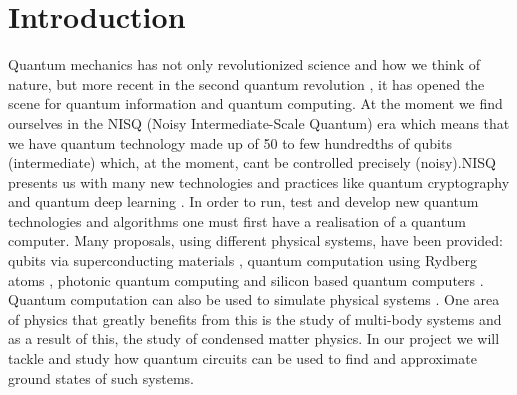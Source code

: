 \documentclass{physics_article}
\date{}
\begin{document}
	\maketitle

	\section{Introduction \label{intro}}
	Quantum mechanics has not only revolutionized science and how we think of nature, but more recent in the second quantum revolution \cite{https://doi.org/10.48550/arxiv.quant-ph/0206091}, it has opened the scene for quantum information and quantum computing. At the moment we find ourselves in the NISQ (Noisy Intermediate-Scale Quantum) era \cite{Preskill2018quantumcomputingin} which means that we have quantum technology made up of 50 to few hundredths of qubits (intermediate) which, at the moment, cant be controlled precisely (noisy).NISQ presents us with many new technologies and practices like quantum cryptography \cite{bernstein_buchmann_dahmen_2009} and quantum deep learning \cite{https://doi.org/10.48550/arxiv.1711.02038}. In order to run, test and develop new quantum technologies and algorithms one must first have a realisation of a quantum computer. Many proposals, using different physical systems, have been provided: qubits via superconducting materials \cite{PhysRevLett.85.2208, nakamura_pashkin_tsai_1999}, quantum computation using Rydberg atoms \cite{PhysRevLett.74.4091,PhysRevLett.75.4714}, photonic quantum computing \cite{knill_laflamme_milburn_2001,doi:10.1126/science.abe8770} and silicon based quantum computers \cite{kane_1998,madzik_asaad_youssry_joecker_rudinger_nielsen_young_proctor_baczewski_laucht_et}. Quantum computation can also be used to simulate physical systems \cite{feynman_1982}. One area of physics that greatly benefits from this is the study of multi-body systems and as a result of this, the study of condensed matter physics. In our project we will tackle and study how quantum circuits can be used to find and approximate ground states of such systems.
\end{document}
